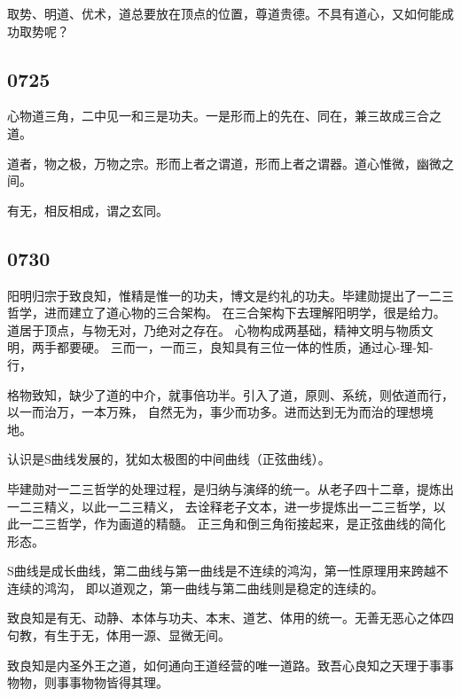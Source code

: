 取势、明道、优术，道总要放在顶点的位置，尊道贵德。不具有道心，又如何能成功取势呢？

\subsection{0725}

心物道三角，二中见一和三是功夫。一是形而上的先在、同在，兼三故成三合之道。

道者，物之极，万物之宗。形而上者之谓道，形而上者之谓器。道心惟微，幽微之间。

有无，相反相成，谓之玄同。



\subsection{0730}

阳明归宗于致良知，惟精是惟一的功夫，博文是约礼的功夫。毕建勋提出了一二三哲学，进而建立了道心物的三合架构。
在三合架构下去理解阳明学，很是给力。道居于顶点，与物无对，乃绝对之存在。
心物构成两基础，精神文明与物质文明，两手都要硬。
三而一，一而三，良知具有三位一体的性质，通过心-理-知-行，

格物致知，缺少了道的中介，就事倍功半。引入了道，原则、系统，则依道而行，以一而治万，一本万殊，
自然无为，事少而功多。进而达到无为而治的理想境地。

认识是S曲线发展的，犹如太极图的中间曲线（正弦曲线）。

毕建勋对一二三哲学的处理过程，是归纳与演绎的统一。从老子四十二章，提炼出一二三精义，以此一二三精义，
去诠释老子文本，进一步提炼出一二三哲学，以此一二三哲学，作为画道的精髓。
正三角和倒三角衔接起来，是正弦曲线的简化形态。

S曲线是成长曲线，第二曲线与第一曲线是不连续的鸿沟，第一性原理用来跨越不连续的鸿沟，
即以道观之，第一曲线与第二曲线则是稳定的连续的。

致良知是有无、动静、本体与功夫、本末、道艺、体用的统一。无善无恶心之体四句教，有生于无，体用一源、显微无间。

致良知是内圣外王之道，如何通向王道经营的唯一道路。致吾心良知之天理于事事物物，则事事物物皆得其理。

